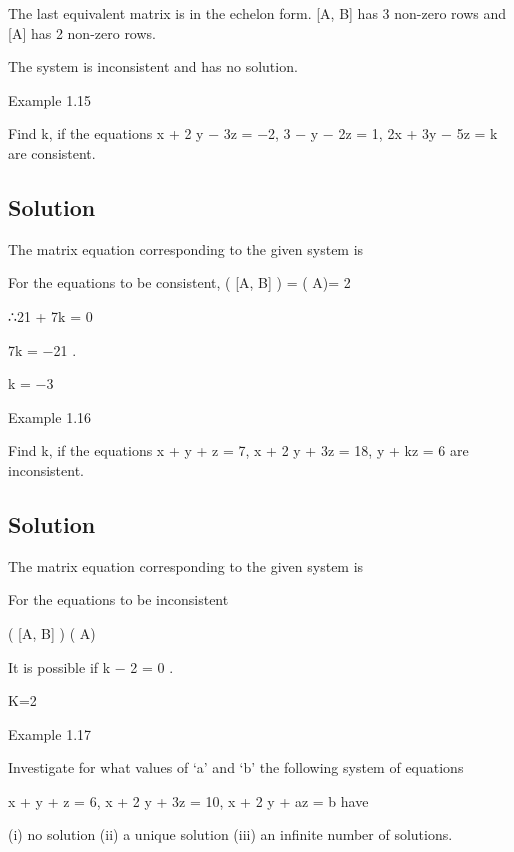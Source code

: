 \documentclass[12pt, a4paper]{article}
\begin{document}
The last equivalent matrix is in the echelon form. [A, B] has 3 non-zero rows and [A] has 2 non-zero rows.



The system is inconsistent and has no solution.

\newpage 
 

Example 1.15

Find k, if the equations x + 2 y − 3z = −2, 3 \times  − y − 2z = 1, 2x + 3y − 5z = k are consistent.

\bigskip \subsection*{Solution}

The matrix equation corresponding to the given system is



For the equations to be consistent, \rho ( [A, B] ) = \rho ( A)= 2

∴21 + 7k = 0

7k = −21 .

k = −3

\newpage 
 

Example 1.16

Find k, if the equations x + y + z = 7, x + 2 y + 3z = 18, y + kz = 6 are inconsistent.

\bigskip \subsection*{Solution}

The matrix equation corresponding to the given system is



For the equations to be inconsistent

\rho ( [A, B] ) \neq  \rho ( A)

It is possible if k − 2 = 0 .

K=2

 

\newpage 
 Example 1.17

Investigate for what values of ‘a’ and ‘b’ the following system of equations

x + y + z = 6, x + 2 y + 3z = 10, x + 2 y + az = b have 

(i) no solution  (ii) a unique solution (iii) an infinite number of solutions.
\end{document}
